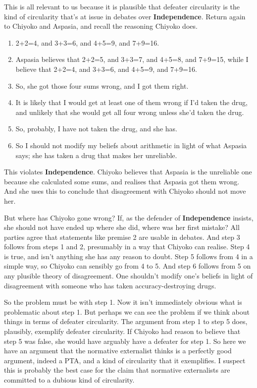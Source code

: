 \documentclass[
  10pt,
  letterpaper,
  twoside]{scrbook}
\providecommand{\tightlist}{%
  \setlength{\itemsep}{0pt}\setlength{\parskip}{0pt}}\usepackage{longtable,booktabs,array}
\begin{document}
This is all relevant to us because it is plausible that defeater
circularity is the kind of circularity that's at issue in debates over
\textbf{Independence}. Return again to {Chiyoko} and {Aspasia}, and
recall the reasoning {Chiyoko} does.

\begin{enumerate}
\def\labelenumi{\arabic{enumi}.}
\tightlist
\item
  2+2=4, and 3+3=6, and 4+5=9, and 7+9=16.
\item
  {Aspasia} believes that 2+2=5, and 3+3=7, and 4+5=8, and 7+9=15, while
  I believe that 2+2=4, and 3+3=6, and 4+5=9, and 7+9=16.
\item
  So, she got those four sums wrong, and I got them right.
\item
  It is likely that I would get at least one of them wrong if I'd taken
  the drug, and unlikely that she would get all four wrong unless she'd
  taken the drug.
\item
  So, probably, I have not taken the drug, and she has.
\item
  So I should not modify my beliefs about arithmetic in light of what
  {Aspasia} says; she has taken a drug that makes her unreliable.
\end{enumerate}

This violates \textbf{Independence}. {Chiyoko} believes that {Aspasia}
is the unreliable one because she calculated some sums, and realises
that {Aspasia} got them wrong. And she uses this to conclude that
disagreement with {Chiyoko} should not move her.

But where has {Chiyoko} gone wrong? If, as the defender of
\textbf{Independence} insists, she should not have ended up where she
did, where was her first mistake? All parties agree that statements like
premise 2 are usable in debates. And step 3 follows from steps 1 and 2,
presumably in a way that {Chiyoko} can realise. Step 4 is true, and
isn't anything she has any reason to doubt. Step 5 follows from 4 in a
simple way, so {Chiyoko} can sensibly go from 4 to 5. And step 6 follows
from 5 on any plusible theory of disagreement. One shouldn't modify
one's beliefs in light of disagreement with someone who has taken
accuracy-destroying drugs.

So the problem must be with step 1. Now it isn't immediately obvious
what is problematic about step 1. But perhaps we can see the problem if
we think about things in terms of defeater circularity. The argument
from step 1 to step 5 does, plausibly, exemplify defeater circularity.
If {Chiyoko} had reason to believe that step 5 was false, she would have
arguably have a defeater for step 1. So here we have an argument that
the normative externalist thinks is a perfectly good argument, indeed a
PTA, and a kind of circularity that it exemplifies. I suspect this is
probably the best case for the claim that normative externalists are
committed to a dubious kind of circularity.
\end{document}
